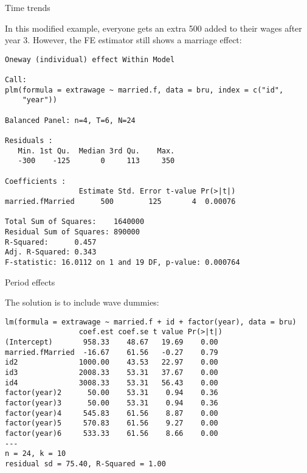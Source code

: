 \documentclass[10pt,ignorenonframetext,]{beamer}
\begin{document}
\begin{frame}[fragile]{Time trends}

In this modified example, everyone gets an extra 500 added to their
wages after year 3. However, the FE estimator still shows a marriage
effect:

\tiny

\begin{verbatim}
Oneway (individual) effect Within Model

Call:
plm(formula = extrawage ~ married.f, data = bru, index = c("id", 
    "year"))

Balanced Panel: n=4, T=6, N=24

Residuals :
   Min. 1st Qu.  Median 3rd Qu.    Max. 
   -300    -125       0     113     350 

Coefficients :
                 Estimate Std. Error t-value Pr(>|t|)
married.fMarried      500        125       4  0.00076

Total Sum of Squares:    1640000
Residual Sum of Squares: 890000
R-Squared:      0.457
Adj. R-Squared: 0.343
F-statistic: 16.0112 on 1 and 19 DF, p-value: 0.000764
\end{verbatim}

\end{frame}

\begin{frame}[fragile]{Period effects}

The solution is to include wave dummies:

\begin{verbatim}
lm(formula = extrawage ~ married.f + id + factor(year), data = bru)
                 coef.est coef.se t value Pr(>|t|)
(Intercept)       958.33    48.67   19.69    0.00 
married.fMarried  -16.67    61.56   -0.27    0.79 
id2              1000.00    43.53   22.97    0.00 
id3              2008.33    53.31   37.67    0.00 
id4              3008.33    53.31   56.43    0.00 
factor(year)2      50.00    53.31    0.94    0.36 
factor(year)3      50.00    53.31    0.94    0.36 
factor(year)4     545.83    61.56    8.87    0.00 
factor(year)5     570.83    61.56    9.27    0.00 
factor(year)6     533.33    61.56    8.66    0.00 
---
n = 24, k = 10
residual sd = 75.40, R-Squared = 1.00
\end{verbatim}

\end{frame}
\end{document}
